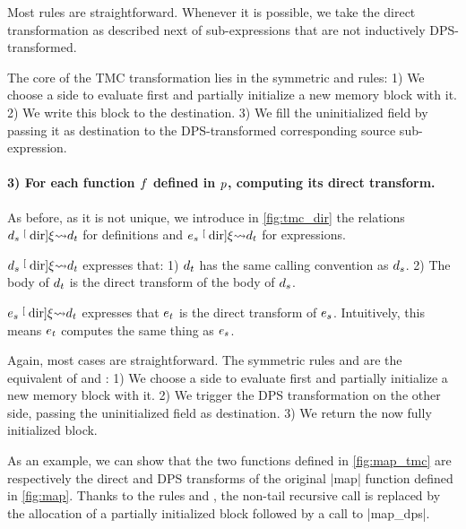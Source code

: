 Most rules are straightforward.
Whenever it is possible, we take the direct transformation as described next of sub-expressions that are not inductively DPS-transformed.

The core of the TMC transformation lies in the symmetric  and  rules:
1) We choose a side to evaluate first and partially initialize a new memory block with it.
2) We write this block to the destination.
3) We fill the uninitialized field by passing it as destination to the DPS-transformed corresponding source sub-expression.

\paragraph{3) For each function $\datalangFn$ defined in $\datalangProg$, computing its direct transform.}
As before, as it is not unique, we introduce in \cref{fig:tmc_dir} the relations $\datalangDef_s \tmcDir{\datalangRenaming} \datalangDef_t$ for definitions and $\datalangExpr_s \tmcDir{\datalangRenaming} \datalangDef_t$ for expressions.

$\datalangDef_s \tmcDir{\datalangRenaming} \datalangDef_t$ expresses that:
1) $\datalangDef_t$ has the same calling convention as $\datalangDef_s$.
2) The body of $\datalangDef_t$ is the direct transform of the body of $\datalangDef_s$.

$\datalangExpr_s \tmcDir{\datalangRenaming} \datalangDef_t$ expresses that $\datalangExpr_t$ is the direct transform of $\datalangExpr_s$.
Intuitively, this means $\datalangExpr_t$ computes the same thing as $\datalangExpr_s$.

Again, most cases are straightforward.
The symmetric rules  and  are the equivalent of  and :
1) We choose a side to evaluate first and partially initialize a new memory block with it.
2) We trigger the DPS transformation on the other side, passing the uninitialized field as destination.
3) We return the now fully initialized block.

\medskip

As an example, we can show that the two \DataLang functions defined in \cref{fig:map_tmc} are respectively the direct and DPS transforms of the original \datalang|map| function defined in \cref{fig:map}.
Thanks to the rules  and , the non-tail recursive call is replaced by the allocation of a partially initialized block followed by a call to \datalang|map_dps|.




